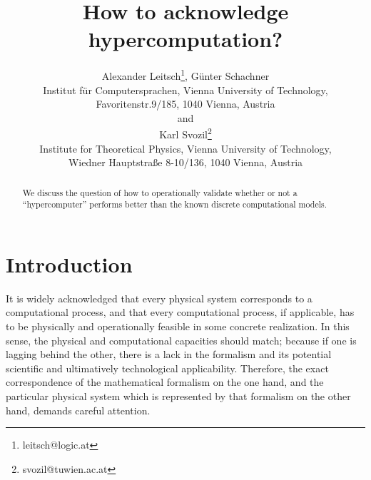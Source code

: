 \documentclass[12pt]{article}
\begin{document}
\title{How to acknowledge hypercomputation?}
\author{Alexander Leitsch\footnote{leitsch@logic.at}, G{\"{u}}nter Schachner \\
 {\small Institut f{\"{u}}r Computersprachen, Vienna University of Technology,}\\ {\small   Favoritenstr.9/185, 1040 Vienna, Austria}\\
{and}\\
Karl Svozil\footnote{svozil@tuwien.ac.at} \\
 {\small Institute for Theoretical Physics, Vienna University of Technology,}\\ {\small   Wiedner Hauptstra\ss e 8-10/136, 1040 Vienna, Austria}
      }

\coverpage

\date{ }
\maketitle


\begin{abstract}
We discuss the question of how to operationally validate whether or not a ``hypercomputer'' performs better than the known discrete computational models.
\end{abstract}

\section{Introduction}

It is widely acknowledged \cite{wolfram-2002,svozil-2005-cu} that every physical system corresponds to a computational process,
and that every computational process, if applicable, has to be physically and operationally feasible in some concrete realization.
In this sense, the physical and computational capacities should match;
because if one is lagging behind the other,
there is a lack in the formalism and its potential scientific and ultimatively technological applicability.
Therefore, the exact correspondence of the mathematical formalism on the one hand, and
the particular physical system which is represented by that formalism  on the other hand, demands careful attention.
\end{document}

